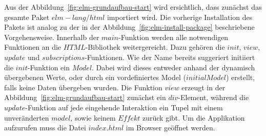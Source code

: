 Aus der Abbildung~\ref{fig:elm-grundaufbau-start} wird ersichtlich, dass zunächst das gesamte Paket $elm-lang/html$ importiert wird. Die vorherige Installation des Pakets ist analog zu der in der Abbildung~\ref{fig:elm-install-package} beschriebene Vorgehensweise.
Innerhalb der $main$-Funktion werden alle notwendigen Funktionen an die $HTML$-Bibliothek weitergereicht. Dazu gehören die $init$, $view$, $update$ und $subscriptions$-Funktionen. Wie der Name bereits suggeriert initiiert die $init$-Funktion ein $Model$. Dabei wird dieses entweder anhand der dynamisch übergebenen Werte, oder durch ein vordefiniertes Model ($initialModel$) erstellt, falls keine Daten übergeben wurden.
Die Funktion $view$ erzeugt in der Abbildung~\ref{fig:elm-grundaufbau-start} zunächst ein $div$-Element, während die $update$-Funktion auf jede eingehende Interaktion ein Tupel mit einem unveränderten $model$, sowie keinem $Effekt$ zurück gibt. Um die Applikation aufzurufen muss die Datei $index.html$ im Browser geöffnet werden.


